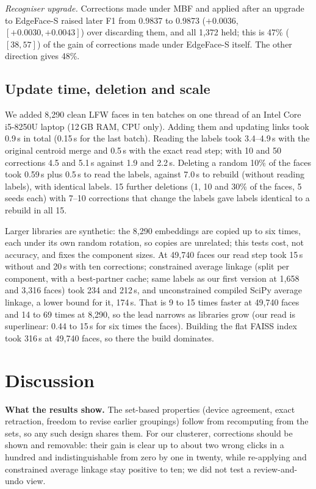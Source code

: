 \documentclass[conference]{IEEEtran}
\begin{document}
\emph{Recogniser upgrade.} Corrections made under MBF and applied after an upgrade to EdgeFace-S raised later F1 from
0.9837 to 0.9873 ($+0.0036$, $[+0.0030,+0.0043]$) over discarding them, and all 1{,}372 held; this is 47\% ($[38,57]$) of
the gain of corrections made under EdgeFace-S itself. The other direction gives 48\%.

\subsection{Update time, deletion and scale}\label{sec:time}
We added 8{,}290 clean LFW faces in ten batches on one thread of an Intel Core i5-8250U laptop (12\,GB RAM, CPU only). Adding
them and updating links took 0.9\,s in total (0.15\,s for the last batch). Reading the labels took 3.4--4.9\,s with the original
centroid merge and 0.5\,s with the exact read step; with 10 and 50 corrections 4.5 and 5.1\,s against 1.9 and 2.2\,s. Deleting
a random 10\% of the faces took 0.59\,s plus 0.5\,s to read the labels, against 7.0\,s to rebuild (without reading labels), with identical labels. 15 further deletions (1, 10 and 30\% of the faces, 5 seeds each) with 7--10 corrections that change the labels gave labels identical to a rebuild in all 15.

Larger libraries are synthetic: the 8{,}290 embeddings are copied up to six times, each under its own random rotation, so
copies are unrelated; this tests cost, not accuracy, and fixes the component sizes. At 49{,}740 faces our read step took 15\,s without and 20\,s
with ten corrections; constrained average linkage (split per component, with a best-partner cache; same labels as our first version
at 1{,}658 and 3{,}316 faces) took 234 and 212\,s, and unconstrained compiled SciPy average linkage, a lower bound for it, 174\,s.
That is 9 to 15 times faster at 49{,}740 faces and 14 to 69 times at 8{,}290, so the lead narrows as libraries grow (our read is
superlinear: 0.44 to 15\,s for six times the faces). Building the flat FAISS index took 316\,s at 49{,}740 faces, so there the build dominates.

\section{Discussion}
\textbf{What the results show.} The set-based properties (device agreement, exact retraction, freedom to revise earlier groupings)
follow from recomputing from the sets, so any such design shares them. For our clusterer, corrections should be shown and removable:
their gain is clear up to about two wrong clicks in a hundred and indistinguishable from zero by one in twenty, while re-applying and constrained average
linkage stay positive to ten; we did not test a review-and-undo view.
\end{document}
